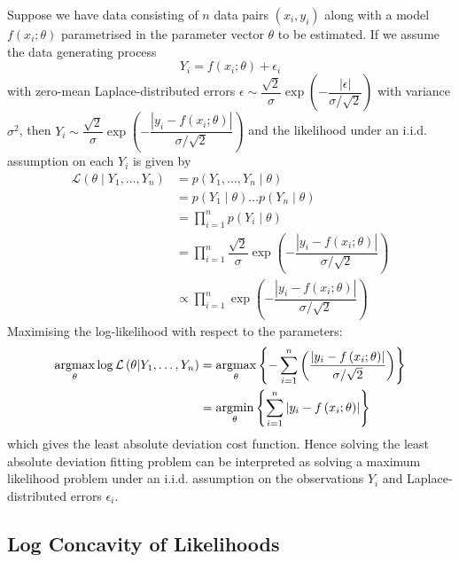 \documentclass[11pt]{report} %
\begin{document}
Suppose we have data consisting of $n$ data pairs $\left(x_{i}, y_{i}\right)$ along with a model $f\left(x_{i}; \theta\right)$ parametrised in the parameter vector $\theta$ to be estimated. If we assume the data generating process
\begin{equation}
Y_{i} = f\left(x_{i}; \theta\right) + \epsilon_{i}
\end{equation}
with zero-mean Laplace-distributed errors $\epsilon \sim \dfrac{\sqrt{2}}{\sigma}\exp\left(-\dfrac{\left|\epsilon\right|}{\sigma/\sqrt{2}}\right)$ with variance $\sigma^{2}$, then $Y_{i} \sim \dfrac{\sqrt{2}}{\sigma}\exp\left(-\dfrac{\left|y_{i} - f\left(x_{i}; \theta\right)\right|}{\sigma/\sqrt{2}}\right)$ and the likelihood under an i.i.d. assumption on each $Y_{i}$ is given by
\begin{align}
\mathcal{L}\left(\theta\middle|Y_{1}, \dots, Y_{n}\right) &= p\left(Y_{1}, \dots, Y_{n}\middle|\theta\right) \\
&= p\left(Y_{1}\middle|\theta\right)\dots p\left(Y_{n}\middle|\theta\right) \\
&= \prod_{i = 1}^{n}p\left(Y_{i}\middle|\theta\right) \\
&= \prod_{i = 1}^{n}\dfrac{\sqrt{2}}{\sigma}\exp\left(-\dfrac{\left|y_{i} - f\left(x_{i}; \theta\right)\right|}{\sigma/\sqrt{2}}\right) \\
&\propto \prod_{i = 1}^{n}\exp\left(-\dfrac{\left|y_{i} - f\left(x_{i}; \theta\right)\right|}{\sigma/\sqrt{2}}\right)
\end{align}
Maximising the log-likelihood with respect to the parameters:
\begin{align}
\operatorname*{argmax}_{\theta}\log\mathcal{L}\left(\theta\middle|Y_{1}, \dots, Y_{n}\right) &= \operatorname*{argmax}_{\theta}\left\{-\sum_{i = 1}^{n}\left(\dfrac{\left|y_{i} - f\left(x_{i}; \theta\right)\right|}{\sigma/\sqrt{2}}\right)\right\} \\
&= \operatorname*{argmin}_{\theta}\left\{\sum_{i = 1}^{n}\left|y_{i} - f\left(x_{i}; \theta\right)\right|\right\}
\end{align}
which gives the least absolute deviation cost function. Hence solving the least absolute deviation fitting problem can be interpreted as solving a maximum likelihood problem under an i.i.d. assumption on the observations $Y_{i}$ and Laplace-distributed errors $\epsilon_{i}$.

\subsection{Log Concavity of Likelihoods}
\end{document}
